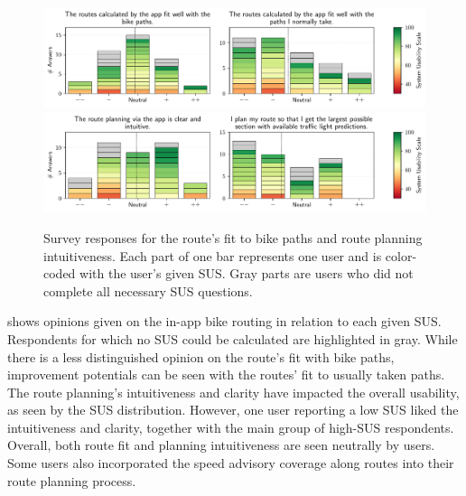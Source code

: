 \begin{figure}[!b]
\caption{Survey responses for the route's fit to bike paths and route planning intuitiveness. Each part of one bar represents one user and is color-coded with the user's given SUS. Gray parts are users who did not complete all necessary SUS questions.}\label{fig:route-fit-bike-paths}
\includegraphics[width=\linewidth]{images/app-usability-questions-route-fit-bike-paths.pdf}
\\
\includegraphics[width=\linewidth]{images/app-usability-questions-route-planning-intuitiveness.pdf}
\end{figure}

 shows opinions given on the in-app bike routing in relation to each given SUS. Respondents for which no SUS could be calculated are highlighted in gray. While there is a less distinguished opinion on the route's fit with bike paths, improvement potentials can be seen with the routes' fit to usually taken paths. The route planning's intuitiveness and clarity have impacted the overall usability, as seen by the SUS distribution. However, one user reporting a low SUS liked the intuitiveness and clarity, together with the main group of high-SUS respondents. Overall, both route fit and planning intuitiveness are seen neutrally by users. Some users also incorporated the speed advisory coverage along routes into their route planning process.

